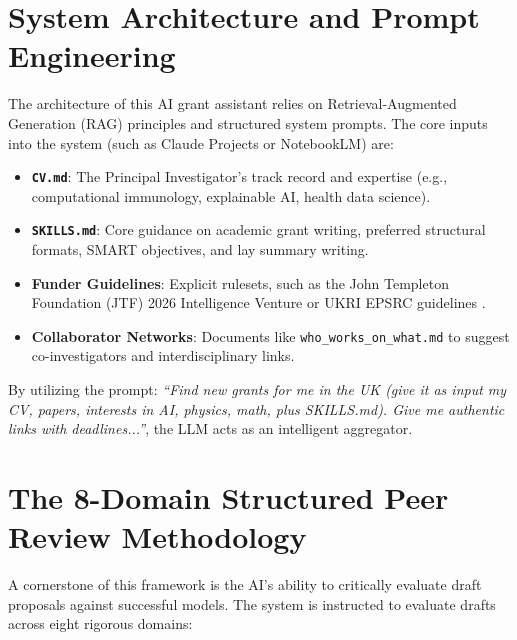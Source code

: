 \documentclass[11pt, a4paper]{article}
\begin{document}
\section{System Architecture and Prompt Engineering}
The architecture of this AI grant assistant relies on Retrieval-Augmented Generation (RAG) principles and structured system prompts. The core inputs into the system (such as Claude Projects or NotebookLM) are:
\begin{itemize}
    \item \textbf{\texttt{CV.md}}: The Principal Investigator's track record and expertise (e.g., computational immunology, explainable AI, health data science).
    \item \textbf{\texttt{SKILLS.md}}: Core guidance on academic grant writing, preferred structural formats, SMART objectives, and lay summary writing.
    \item \textbf{Funder Guidelines}: Explicit rulesets, such as the John Templeton Foundation (JTF) 2026 Intelligence Venture or UKRI EPSRC guidelines \cite{ukri2023guidance}.
    \item \textbf{Collaborator Networks}: Documents like \texttt{who\_works\_on\_what.md} to suggest co-investigators and interdisciplinary links.
\end{itemize}

By utilizing the prompt: \textit{``Find new grants for me in the UK (give it as input my CV, papers, interests in AI, physics, math, plus SKILLS.md). Give me authentic links with deadlines...''}, the LLM acts as an intelligent aggregator.

\section{The 8-Domain Structured Peer Review Methodology}
A cornerstone of this framework is the AI's ability to critically evaluate draft proposals against successful models. The system is instructed to evaluate drafts across eight rigorous domains:
\end{document}
